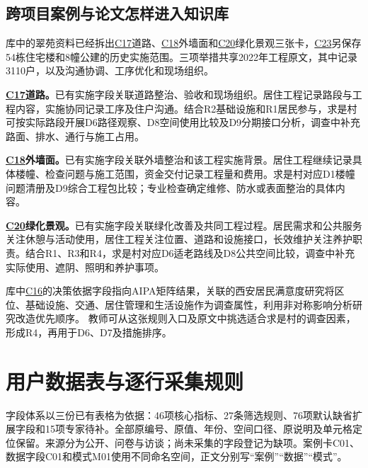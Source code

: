 \documentclass[UTF8,11pt,fontset=windows]{ctexart}
\begin{document}
\subsection{跨项目案例与论文怎样进入知识库}

库中的翠苑资料已经拆出\hyperlink{EXP-4fb5ae8b-4f8c-4b38-9f15-7fd612098a66}{C17}道路、\hyperlink{EXP-54fdb799-7504-45fd-bd7a-b619e98cf6cb}{C18}外墙面和\hyperlink{EXP-825f931a-a8d3-49c2-9c42-e73bea9922e6}{C20}绿化景观三张卡，\hyperlink{EXP-1d56715f-f6b6-4e9f-8298-5ce656ee40c5}{C23}另保存54栋住宅楼和8幢公建的历史实施范围。三项举措共享2022年工程原文，其中记录3110户，以及沟通协调、工序优化和现场组织。\cite{cuiyuan}

\textbf{\hyperlink{EXP-4fb5ae8b-4f8c-4b38-9f15-7fd612098a66}{C17}道路。}已有实施字段关联道路整治、验收和现场组织。居住工程记录路段与工程内容，实施协同记录工序及住户沟通。结合R2基础设施和R1居民参与，求是村可按实际路段开展D6路径观察、D8空间使用比较及D9分期接口分析，调查中补充路面、排水、通行与施工占用。

\textbf{\hyperlink{EXP-54fdb799-7504-45fd-bd7a-b619e98cf6cb}{C18}外墙面。}已有实施字段关联外墙整治和该工程实施背景。居住工程继续记录具体楼幢、检查问题与施工范围，资金交付记录工程量和费用。求是村对应D1楼幢问题清册及D9综合工程包比较；专业检查确定维修、防水或表面整治的具体内容。

\textbf{\hyperlink{EXP-825f931a-a8d3-49c2-9c42-e73bea9922e6}{C20}绿化景观。}已有实施字段关联绿化改善及共同工程过程。居民需求和公共服务关注休憩与活动使用，居住工程关注位置、道路和设施接口，长效维护关注养护职责。结合R1、R3和R4，求是村对应D6适老路线及D8公共空间比较，调查中补充实际使用、遮阴、照明和养护事项。

库中\hyperlink{EXP-2c88cc20-e2d3-4a32-a176-e48d753a4712}{C16}的决策依据字段指向AIPA矩阵结果，关联的西安居民满意度研究将区位、基础设施、交通、居住管理和生活设施作为调查属性，利用非对称影响分析研究改造优先顺序。\cite{paper} 教师可从这张规则入口及原文中挑选适合求是村的调查因素，形成R4，再用于D6、D7及措施排序。

\section{用户数据表与逐行采集规则}

字段体系以三份已有表格为依据：46项核心指标、27条筛选规则、76项默认缺省扩展字段和15项专家待补。全部原编号、原值、年份、空间口径、原说明及单元格定位保留。来源分为公开、问卷与访谈；尚未采集的字段登记为缺项。案例卡C01、数据字段C01和模式M01使用不同命名空间，正文分别写“案例”“数据”“模式”。
\end{document}
